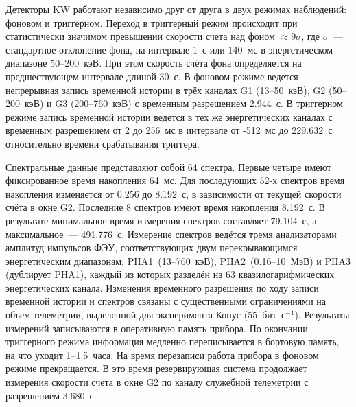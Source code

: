 Детекторы KW работают независимо друг от друга в двух режимах наблюдений: 
фоновом и триггерном. Переход в триггерный режим происходит при статистически 
значимом превышении скорости счета над фоном $\approx 9\sigma$\footnotemark, 
где $\sigma$~--- стандартное отклонение фона, на интервале 1~с или 140~мс 
в энергетическом диапазоне 50--200~кэВ. При этом скорость счёта фона 
определяется на предшествующем интервале длиной 30~с. В фоновом режиме ведется 
непрерывная запись временной истории в трёх каналах G1 (13--50~кэВ), G2 (50--200~кэВ) 
и G3 (200--760~кэВ) с временным разрешением 2.944~с\footnotemark. В триггерном режиме запись 
временной истории ведется в тех же энергетических каналах с временным разрешением 
от 2 до 256~мс в интервале от -512~мс до 229.632~с относительно времени срабатывания 
триггера.



Спектральные данные представляют собой 64 спектра. Первые четыре имеют фиксированное время накопления 64~мс.
Для последующих 52-х спектров время накопления изменяется от 0.256 до 8.192~с, 
в зависимости от текущей скорости счёта в окне G2. Последние 8 спектров имеют время накопления 8.192~с. 
В результате минимальное время измерения спектров составляет 79.104~с, а максимальное~--- 491.776~с.
Измерение спектров ведётся тремя анализаторами амплитуд импульсов ФЭУ, соответствующих
двум перекрывающимся энергетическим диапазонам:  
PHA1~(13--760~кэВ), PHA2~(0.16--10~МэВ) и PHA3 (дублирует PHA1), каждый из которых 
разделён на 63 квазилогарифмических энергетических канала. 
Изменения временного разрешения по ходу записи временной истории и спектров связаны 
с существенными ограничениями на объем телеметрии, 
выделенной для эксперимента Конус (55~бит~с$^{-1}$). Результаты измерений записываются в оперативную 
память прибора. По окончании триггерного режима информация медленно переписывается 
в бортовую память, на что уходит 1--1.5~часа. На время перезаписи работа прибора 
в фоновом режиме прекращается. В это время резервирующая система продолжает измерения
скорости счета в окне G2 по каналу служебной телеметрии с разрешением 3.680~с.

